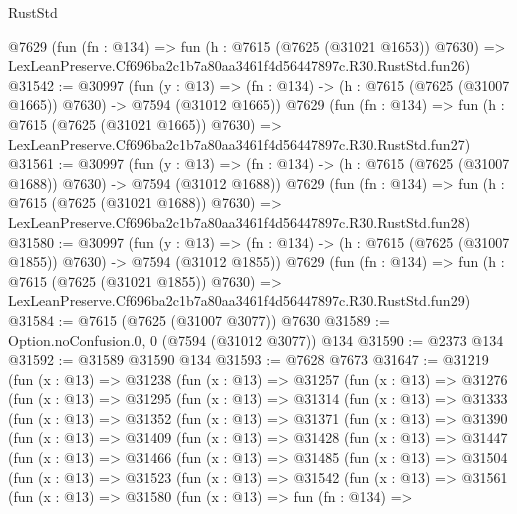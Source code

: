 \begin{lexlean}{RustStd}
\begin{coremodule}
    @7629
    (fun (fn : @134) =>
    fun (h : @7615 (@7625 (@31021 @1653)) @7630) =>
    LexLeanPreserve.Cf696ba2c1b7a80aa3461f4d56447897c.R30.RustStd.fun26)
@31542 := @30997
    (fun (y : @13) =>
    (fn : @134) -> (h : @7615 (@7625 (@31007 @1665)) @7630) -> @7594 (@31012 @1665))
    @7629
    (fun (fn : @134) =>
    fun (h : @7615 (@7625 (@31021 @1665)) @7630) =>
    LexLeanPreserve.Cf696ba2c1b7a80aa3461f4d56447897c.R30.RustStd.fun27)
@31561 := @30997
    (fun (y : @13) =>
    (fn : @134) -> (h : @7615 (@7625 (@31007 @1688)) @7630) -> @7594 (@31012 @1688))
    @7629
    (fun (fn : @134) =>
    fun (h : @7615 (@7625 (@31021 @1688)) @7630) =>
    LexLeanPreserve.Cf696ba2c1b7a80aa3461f4d56447897c.R30.RustStd.fun28)
@31580 := @30997
    (fun (y : @13) =>
    (fn : @134) -> (h : @7615 (@7625 (@31007 @1855)) @7630) -> @7594 (@31012 @1855))
    @7629
    (fun (fn : @134) =>
    fun (h : @7615 (@7625 (@31021 @1855)) @7630) =>
    LexLeanPreserve.Cf696ba2c1b7a80aa3461f4d56447897c.R30.RustStd.fun29)
@31584 := @7615 (@7625 (@31007 @3077)) @7630
@31589 := Option.noConfusion.{0, 0} (@7594 (@31012 @3077)) @134
@31590 := @2373 @134
@31592 := @31589 @31590 @134
@31593 := @7628 @7673
@31647 := @31219
    (fun (x : @13) =>
    @31238
      (fun (x : @13) =>
      @31257
        (fun (x : @13) =>
        @31276
          (fun (x : @13) =>
          @31295
            (fun (x : @13) =>
            @31314
              (fun (x : @13) =>
              @31333
                (fun (x : @13) =>
                @31352
                  (fun (x : @13) =>
                  @31371
                    (fun (x : @13) =>
                    @31390
                      (fun (x : @13) =>
                      @31409
                        (fun (x : @13) =>
                        @31428
                          (fun (x : @13) =>
                          @31447
                            (fun (x : @13) =>
                            @31466
                              (fun (x : @13) =>
                              @31485
                                (fun (x : @13) =>
                                @31504
                                  (fun (x : @13) =>
                                  @31523
                                    (fun (x : @13) =>
                                    @31542
                                      (fun (x : @13) =>
                                      @31561
                                        (fun (x : @13) =>
                                        @31580
                                          (fun (x : @13) =>
                                          fun (fn : @134) =>

\end{coremodule}
\end{lexlean}
